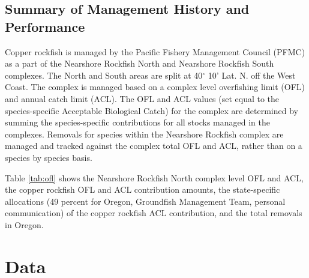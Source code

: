 \documentclass[11pt,
  english,
  a4paper,
]{article}
\begin{document}

\hypertarget{summary-of-management-history-and-performance}{%
\subsection{Summary of Management History and Performance}\label{summary-of-management-history-and-performance}}

\leavevmode\tagmcend\tagstructend


Copper rockfish is managed by the Pacific Fishery Management Council (PFMC) as a part of the Nearshore Rockfish North and Nearshore Rockfish South complexes. The North and South areas are split at 40{\(^\circ\)\leavevmode\tagmcend\tagstructend} 10' Lat. N. off the West Coast. The complex is managed based on a complex level overfishing limit (OFL) and annual catch limit (ACL). The OFL and ACL values (set equal to the species-specific Acceptable Biological Catch) for the complex are determined by summing the species-specific contributions for all stocks managed in the complexes. Removals for species within the Nearshore Rockfish complex are managed and tracked against the complex total OFL and ACL, rather than on a species by species basis.

\leavevmode\tagmcend\tagstructend\par


Table \ref{tab:ofl} shows the Nearshore Rockfish North complex level OFL and ACL, the copper rockfish OFL and ACL contribution amounts, the state-specific allocations (49 percent for Oregon, Groundfish Management Team, personal communication) of the copper rockfish ACL contribution, and the total removals in Oregon.

\leavevmode\tagmcend\tagstructend\par


\hypertarget{data}{%
\section{Data}\label{data}}

\leavevmode\tagmcend\tagstructend

\end{document}
